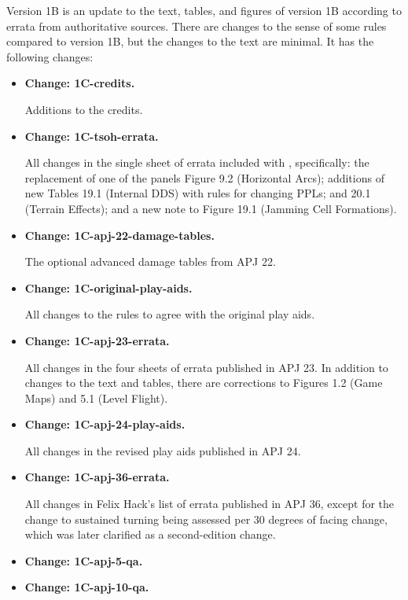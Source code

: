 \documentclass{report}
\newcommand{\changetag}[1]{\textbf{Change: #1.}\par}
\begin{document}
Version 1B is an update to the text, tables, and figures of version 1B according to errata from authoritative sources. There are changes to the sense of some rules compared to version 1B, but the changes to the text are minimal. It has the following changes:

\begin{itemize}

    \item\changetag{1C-credits}

        Additions to the credits.

    \item\changetag{1C-tsoh-errata}

        All changes in the single sheet of errata included with {\TSOH}, specifically: the replacement of one of the panels Figure 9.2 (Horizontal Arcs); additions of new Tables 19.1 (Internal DDS) with rules for changing PPLs; and 20.1 (Terrain Effects); and a new note to Figure 19.1 (Jamming Cell Formations).

    \item\changetag{1C-apj-22-damage-tables}

        The optional advanced damage tables from APJ 22.

    \item\changetag{1C-original-play-aids}

        All changes to the rules to agree with the original play aids.

    \item\changetag{1C-apj-23-errata}

        All changes in the four sheets of errata published in APJ 23.
        In addition to changes to the text and tables, there are corrections to Figures 1.2 (Game Maps) and 5.1 (Level Flight).

    \item\changetag{1C-apj-24-play-aids}

        All changes in the revised play aids published in APJ 24.

    \item\changetag{1C-apj-36-errata}

        All changes in Felix Hack’s list of errata published in APJ 36, except for the change to sustained turning being assessed per 30 degrees of facing change, which was later clarified as a second-edition change.

    \item\changetag{1C-apj-5-qa}

    \item\changetag{1C-apj-10-qa}


\end{itemize}
\end{document}
